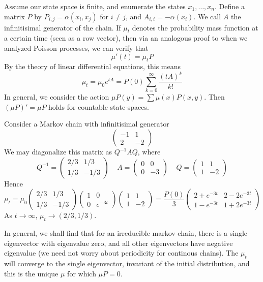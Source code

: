 Assume our state space is finite, and enumerate the states $x_1, \dots, x_n$. Define a matrix $P$ by $P_{i,j} = \alpha(x_i, x_j)$ for $i \neq j$, and $A_{i,i} = - \alpha(x_i)$. We call $A$ the infinitisimal generator of the chain. If $\mu_t$ denotes the probability mass function at a certain time (seen as a row vector), then via an analogous proof to when we analyzed Poisson processes, we can verify that
%
\[ \mu'(t) = \mu_t P \]
%
By the theory of linear differential equations, this means
%
\[ \mu_t = \mu_0 e^{tA} = P(0) \sum_{k = 0}^\infty \frac{(tA)^k}{k!} \]
%
In general, we consider the action $\mu P(y) = \sum \mu(x) P(x,y)$. Then $(\mu P)' = \mu P$ holds for countable state-spaces.

\begin{example}
    Consider a Markov chain with infinitisimal generator
    \[ \begin{pmatrix} -1 & 1 \\ 2 & -2 \end{pmatrix} \]
    We may diagonalize this matrix as $Q^{-1}AQ$, where
    \[ Q^{-1} = \begin{pmatrix} 2/3 & 1/3 \\ 1/3 & -1/3 \end{pmatrix}\ \ \ \ \ A = \begin{pmatrix} 0 & 0 \\ 0 & -3 \end{pmatrix}\ \ \ \ \ Q = \begin{pmatrix} 1 & 1 \\ 1 & -2 \end{pmatrix} \]
    Hence
    \[ \mu_t = \mu_0 \begin{pmatrix} 2/3 & 1/3 \\ 1/3 & -1/3 \end{pmatrix} \begin{pmatrix} 1 & 0 \\ 0 & e^{-3t} \end{pmatrix} \begin{pmatrix} 1 & 1 \\ 1 & -2 \end{pmatrix} = \frac{P(0)}{3} \begin{pmatrix} 2 + e^{-3t} & 2 - 2e^{-3t} \\ 1 - e^{-3t} & 1 + 2e^{-3t} \end{pmatrix} \]
    As $t \to \infty$, $\mu_t \to (2/3, 1/3)$.
\end{example}

In general, we shall find that for an irreducible markov chain, there is a single eigenvector with eigenvalue zero, and all other eigenvectors have negative eigenvalue (we need not worry about periodicity for continous chains). The $\mu_t$ will converge to the single eigenvector, invariant of the initial distribution, and this is the unique $\mu$ for which $\mu P = 0$.

